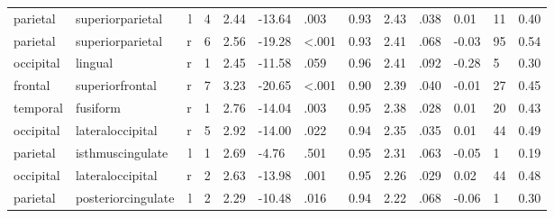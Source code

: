 \documentclass{article}
\begin{document}
\begin{longtable}{llrR{1.3cm}R{1cm}R{1.3cm}R{1cm}R{1cm}R{1.3cm}R{1cm}R{1.8cm}R{1.3cm}R{1.8cm}}
  parietal &          superiorparietal &    l &         4 &                  2.44 &           -13.64 &               .003 &                               0.93 &                          2.43 &                            .038 &   0.01 &     11 &      0.40 \\
  parietal &          superiorparietal &    r &         6 &                  2.56 &           -19.28 &      \textless.001 &                               0.93 &                          2.41 &                            .068 &  -0.03 &     95 &      0.54 \\
 occipital &                   lingual &    r &         1 &                  2.45 &           -11.58 &               .059 &                               0.96 &                          2.41 &                            .092 &  -0.28 &      5 &      0.30 \\
   frontal &           superiorfrontal &    r &         7 &                  3.23 &           -20.65 &      \textless.001 &                               0.90 &                          2.39 &                            .040 &  -0.01 &     27 &      0.45 \\
  temporal &                  fusiform &    r &         1 &                  2.76 &           -14.04 &               .003 &                               0.95 &                          2.38 &                            .028 &   0.01 &     20 &      0.43 \\
 occipital &          lateraloccipital &    r &         5 &                  2.92 &           -14.00 &               .022 &                               0.94 &                          2.35 &                            .035 &   0.01 &     44 &      0.49 \\
  parietal &          isthmuscingulate &    l &         1 &                  2.69 &            -4.76 &               .501 &                               0.95 &                          2.31 &                            .063 &  -0.05 &      1 &      0.19 \\
 occipital &          lateraloccipital &    r &         2 &                  2.63 &           -13.98 &               .001 &                               0.95 &                          2.26 &                            .029 &   0.02 &     44 &      0.48 \\
  parietal &        posteriorcingulate &    l &         2 &                  2.29 &           -10.48 &               .016 &                               0.94 &                          2.22 &                            .068 &  -0.06 &      1 &      0.30 \\

\end{longtable}
\end{document}
